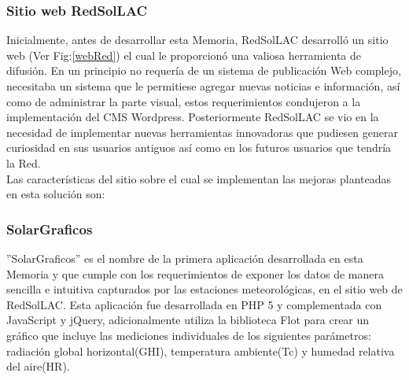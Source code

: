 \subsubsection{Sitio web RedSolLAC}
Inicialmente, antes de desarrollar esta Memoria, RedSolLAC desarrolló un sitio web (Ver Fig:\ref{webRed}) el cual le proporcionó una valiosa herramienta de difusión. En un principio no requería de un sistema de publicación Web complejo, necesitaba un sistema que le permitiese agregar nuevas noticias e información, así como de administrar la parte visual, estos requerimientos condujeron a la implementación del CMS Wordpress. Posteriormente RedSolLAC se vio en la necesidad de implementar nuevas herramientas innovadoras que pudiesen generar curiosidad en sus usuarios antiguos así como en los futuros usuarios que tendría la Red.\\
Las características del sitio sobre el cual se implementan las mejoras planteadas en esta solución son:
\begin{table}[h!]
\caption{Características sitio Web RedSolLAC}
\end{table}

\newpage
\subsubsection{SolarGraficos}
''SolarGraficos'' es el nombre de la primera aplicación desarrollada en esta Memoria y que cumple con los requerimientos de exponer los datos de manera sencilla e intuitiva capturados por las estaciones meteorológicas, en el sitio web de RedSolLAC. Esta aplicación fue desarrollada en PHP 5 y complementada con JavaScript y jQuery, adicionalmente utiliza la biblioteca Flot para crear un gráfico que incluye las mediciones individuales de los siguientes parámetros: radiación global horizontal(GHI), temperatura ambiente(Tc) y humedad relativa del aire(HR).\\

